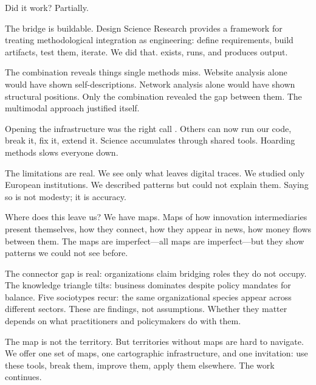 \documentclass[../main.tex]{subfiles}
\begin{document}
Did it work? Partially.

The bridge is buildable. Design Science Research \cite{simon1996sciences,gregor2013positioning} provides a framework for treating methodological integration as engineering: define requirements, build artifacts, test them, iterate. We did that. \RoleBox{} exists, runs, and produces output.

The combination reveals things single methods miss. Website analysis alone would have shown self-descriptions. Network analysis alone would have shown structural positions. Only the combination revealed the gap between them. The multimodal approach justified itself.

Opening the infrastructure was the right call \cite{salganik2018bit}. Others can now run our code, break it, fix it, extend it. Science accumulates through shared tools. Hoarding methods slows everyone down.

The limitations are real. We see only what leaves digital traces. We studied only European institutions. We described patterns but could not explain them. Saying so is not modesty; it is accuracy.

Where does this leave us? We have maps. Maps of how innovation intermediaries present themselves, how they connect, how they appear in news, how money flows between them. The maps are imperfect---all maps are imperfect---but they show patterns we could not see before.

The connector gap is real: organizations claim bridging roles they do not occupy. The knowledge triangle tilts: business dominates despite policy mandates for balance. Five sociotypes recur: the same organizational species appear across different sectors. These are findings, not assumptions. Whether they matter depends on what practitioners and policymakers do with them.

The map is not the territory. But territories without maps are hard to navigate. We offer one set of maps, one cartographic infrastructure, and one invitation: use these tools, break them, improve them, apply them elsewhere. The work continues.
\end{document}
